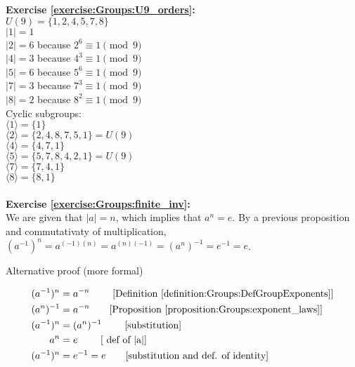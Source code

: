 \noindent\textbf{Exercise \ref{exercise:Groups:U9_orders}:}\\
$U(9)=\{1,2,4,5,7,8\}$\\
$|1|=1$\\
$|2|=6$ because $2^6\equiv 1\pmod{9}$\\
$|4|=3$ because $4^3\equiv 1\pmod{9}$\\
$|5|=6$ because $5^6\equiv 1\pmod{9}$\\
$|7|=3$ because $7^3\equiv 1\pmod{9}$\\
$|8|=2$ because $8^2\equiv 1\pmod{9}$\\
Cyclic subgroups:\\
$\langle1\rangle=\{1\}$\\
$\langle2\rangle=\{2,4,8,7,5,1\}=U(9)$\\
$\langle4\rangle=\{4,7,1\}$\\
$\langle5\rangle=\{5,7,8,4,2,1\}=U(9)$\\
$\langle7\rangle=\{7,4,1\}$\\
$\langle8\rangle=\{8,1\}$\\
\\

\noindent\textbf{Exercise \ref{exercise:Groups:finite_inv}:}\\
We are given that $|a|=n$, which implies that $a^n=e$. By a previous proposition and commutativaty of multiplication, $(a^{-1})^n = a^{(-1)(n)} = a^{(n)(-1)} = (a^n)^{-1} = e^{-1} = e$. 

Alternative proof (more formal)

\begin{align*}
(a^{-1})^n &= a^{-n} \qquad \textrm{ [Definition \ref{definition:Groups:DefGroupExponents}]}\\
(a^n)^{-1} &= a^{-n} \qquad \textrm{[Proposition  \ref{proposition:Groups:exponent_laws}]}\\
(a^{-1})^n &= (a^n)^{-1} \qquad \textrm{ [substitution]}\\ 
a^n &= e \qquad \textrm{  [ def of  |a|]} \\
(a^{-1})^n &= e^{-1} = e  \qquad \textrm{[substitution and def. of identity]}
\end{align*}

